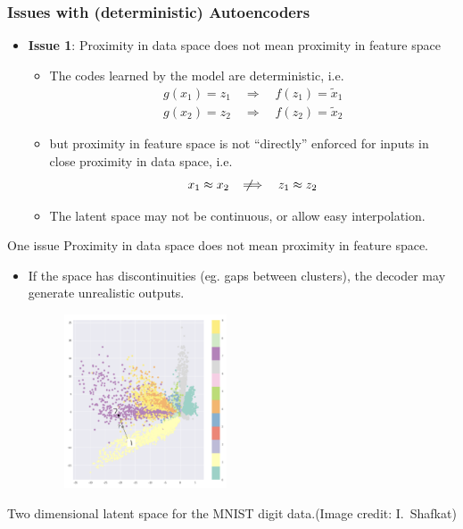 \documentclass[11pt,handout,aspectratio=169]{beamer}
\begin{document}
\begin{frame}
  \frametitle{Issues with (deterministic) Autoencoders}

  \begin{itemize}
  \item \textbf{Issue 1}: Proximity in data space does not mean proximity in feature space
    \begin{itemize}
    \item The codes learned by the model are deterministic, i.e.
      $$
      \begin{aligned}
        g(x_1) = z_1 \quad\Longrightarrow\quad f(z_1) = \tilde x_1 \\
        g(x_2) = z_2 \quad\Longrightarrow\quad f(z_2) = \tilde x_2 
      \end{aligned}
      $$

   \item but proximity in feature space is not ``directly'' enforced for inputs in close proximity in data space, i.e.
      $$
x_1 \approx x_2\quad\not\!\Longrightarrow  \quad     z_1 \approx z_2 
      $$

    \item The latent space may not be continuous, or allow easy interpolation.


    \end{itemize}
  \end{itemize}
\end{frame}


\begin{frame}{One issue}
Proximity in data space does not mean proximity in feature space.
    \begin{itemize}
    \item If the space has discontinuities (eg. gaps between clusters), the decoder may generate unrealistic outputs.

      \begin{figure}
      \includegraphics[width=1.9in]{pics/mnist-ae}
      \end{figure}
    \end{itemize}

  {\tiny Two dimensional latent space for the MNIST digit data.(Image credit: I.~Shafkat)}
\end{frame}
\end{document}
